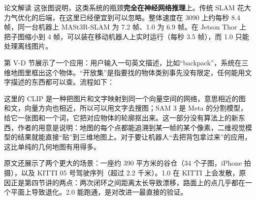 \begin{interp}{论文解读}
这张图说明，这类系统的瓶颈\textbf{完全在神经网络推理}上。传统 SLAM 花大力气优化的后端，在这里已经便宜到可以忽略。整体速度在 3090 上约每秒 8.4 帧，同一台机器上 MASt3R-SLAM 为 7.2 帧、1.0 为 6.9 帧。在 Jetson Thor 上把子图缩小到 4 帧，可以装在移动机器人上实时运行（每秒 3.5 帧），而 1.0 只能处理离线图片。


第 V-D 节展示了一个应用：用户输入一句英文描述，比如“backpack”，系统在三维地图里框出这个物体。“开放集”是指要找的物体类别事先没有限定，任何能用文字描述的东西都可以查。流程如下：

\begin{center}
\end{center}

这里的 CLIP 是一种把图片和文字映射到同一个向量空间的网络，意思相近的图和文，向量方向也相近，所以可以用文字去搜图；SAM 3 是 Meta 的分割模型，给它一张图和一个词，它把对应物体的轮廓抠出来。这一部分没有算法上的新东西，作者的用意是说明：地图的每个点都能追溯到某一帧的某个像素，二维视觉模型的结果就能直接“贴”到三维地图上。对于要让机器人“去把背包拿过来”的应用，这比单纯的几何地图有用得多。

原文还展示了两个更大的场景：一座约 390 平方米的谷仓（34 个子图，iPhone 拍摄），以及 KITTI 05 号驾驶序列（超过 2.2 千米）。1.0 在 KITTI 上会发散，原因正是第四节讲的两点：两次闭环之间距离太长导致漂移，路面上的点几乎都在一个平面上导致退化。2.0 能跑通，是对改进一最直接的验证。


\end{interp}

